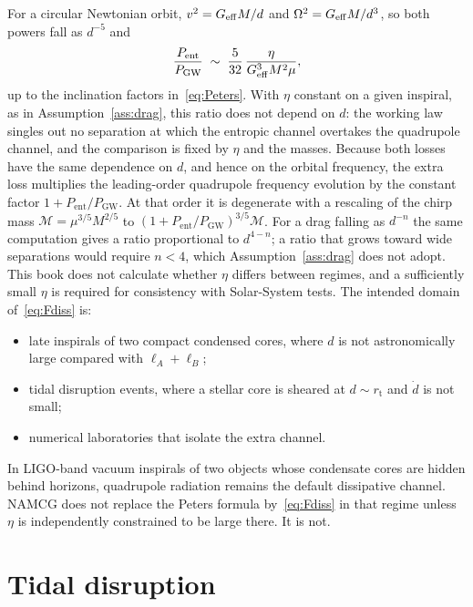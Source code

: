 For a circular Newtonian orbit, \(v^2=G_{\mathrm{eff}} M/d\) and
\(\Omega^2=G_{\mathrm{eff}} M/d^3\), so both powers fall as \(d^{-5}\) and
\begin{equation}
  \label{eq:ratio}
  \frac{P_{\mathrm{ent}}}{P_{\mathrm{GW}}}
  \;\sim\;
  \frac{5}{32}\,
  \frac{\eta}{G_{\mathrm{eff}}^3 M^2\mu},
\end{equation}
up to the inclination factors in~\eqref{eq:Peters}. With \(\eta\)
constant on a given inspiral, as in Assumption~\ref{ass:drag}, this
ratio does not depend on \(d\): the working law singles out no
separation at which the entropic channel overtakes the quadrupole
channel, and the comparison is fixed by \(\eta\) and the masses.
Because both losses have the same dependence on \(d\), and hence on
the orbital frequency, the extra loss multiplies the leading-order
quadrupole frequency evolution by the constant factor
\(1+P_{\mathrm{ent}}/P_{\mathrm{GW}}\). At that order it is
degenerate with a rescaling of the chirp mass
\(\mathcal M=\mu^{3/5}M^{2/5}\) to
\((1+P_{\mathrm{ent}}/P_{\mathrm{GW}})^{3/5}\mathcal M\).
For a drag falling as \(d^{-n}\) the same computation gives a ratio
proportional to \(d^{4-n}\); a ratio that grows toward wide
separations would require \(n<4\), which
Assumption~\ref{ass:drag} does not adopt. This book does not
calculate whether \(\eta\) differs between regimes, and a
sufficiently small \(\eta\) is required for consistency with
Solar-System tests.
The intended domain of~\eqref{eq:Fdiss} is:

\begin{itemize}
  \item late inspirals of two compact condensed cores, where
        \(d\) is not astronomically large compared with
        \(\ell_A+\ell_B\);
  \item tidal disruption events, where a stellar core is sheared
        at \(d\sim r_{\mathrm{t}}\) and \(\dot d\) is not small;
  \item numerical laboratories that isolate the extra channel.
\end{itemize}

In LIGO-band vacuum inspirals of two objects whose condensate
cores are hidden behind horizons, quadrupole radiation remains
the default dissipative channel. NAMCG does not replace the
Peters formula by~\eqref{eq:Fdiss} in that regime unless
\(\eta\) is independently constrained to be large there. It is
not.

\section{Tidal disruption}
\label{sec:ch14-tde}


